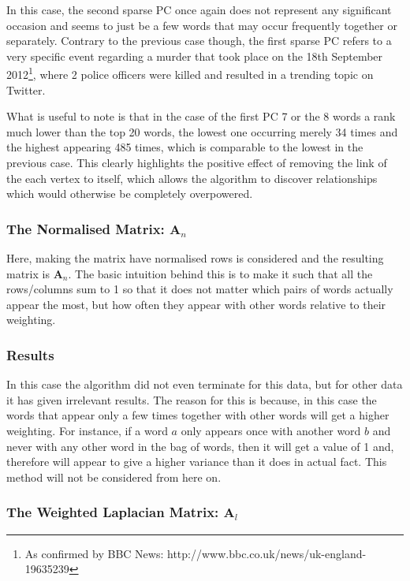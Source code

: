\documentclass[11pt,a4paper]{article}
\begin{document}
In this case, the second sparse PC once again does not represent any significant occasion and seems to just be a few words that may occur frequently together or separately. Contrary to the previous case though, the first sparse PC refers to a very specific event regarding a murder that took place on the 18th September 2012\footnote{As confirmed by BBC News: http://www.bbc.co.uk/news/uk-england-19635239}, where 2 police officers were killed and resulted in a trending topic on Twitter. 

What is useful to note is that in the case of the first PC 7 or the 8 words a rank much lower than the top 20 words, the lowest one occurring merely 34 times and the highest appearing 485 times, which is comparable to the lowest in the previous case. This clearly highlights the positive effect of removing the link of the each vertex to itself, which allows the algorithm to discover relationships which would otherwise be completely overpowered. 

\subsubsection{The Normalised Matrix: $\mathbf{A}_{n}$}
Here, making the matrix have normalised rows is considered and the resulting matrix is $\mathbf{A}_n$. The basic intuition behind this is to make it such that all the rows/columns sum to 1 so that it does not matter which pairs of words actually appear the most, but how often they appear with other words relative to their weighting.

\subsubsection*{Results}
In this case the algorithm did not even terminate for this data, but for other data it has given irrelevant results. The reason for this is because, in this case the words that appear only a few times together with other words will get a higher weighting. For instance, if a word $a$ only appears once with another word $b$ and never with any other word in the bag of words, then it will get a value of 1 and, therefore will appear to give a higher variance than it does in actual fact. This method will not be considered from here on.

\subsubsection{The Weighted Laplacian Matrix: $\mathbf{A}_{l}$}
\end{document}
